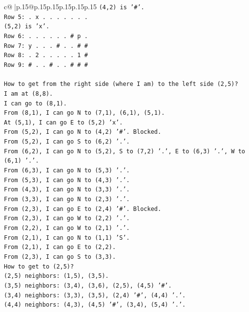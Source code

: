 \documentclass{article}
\begin{document}
{\begin{supertabular}{c@{$\;$}|p{.15\linewidth}@{}p{.15\linewidth}p{.15\linewidth}p{.15\linewidth}p{.15\linewidth}p{.15\linewidth}}
{{{\texttt{(4,2) is '\#'.} \\
\texttt{Row 5: . x . . . . . . .} \\
\texttt{(5,2) is 'x'.} \\
\texttt{Row 6: . . . . . . \# p .} \\
\texttt{Row 7: y . . . \# . . \# \#} \\
\texttt{Row 8: . 2 . . . . . 1 \#} \\
\texttt{Row 9: \# . . \# . . \# \# \#} \\
\\ 
\texttt{How to get from the right side (where I am) to the left side (2,5)?} \\
\texttt{I am at (8,8).} \\
\texttt{I can go to (8,1).} \\
\texttt{From (8,1), I can go N to (7,1), (6,1), (5,1).} \\
\texttt{At (5,1), I can go E to (5,2) 'x'.} \\
\texttt{From (5,2), I can go N to (4,2) '\#'. Blocked.} \\
\texttt{From (5,2), I can go S to (6,2) '.'.} \\
\texttt{From (6,2), I can go N to (5,2), S to (7,2) '.', E to (6,3) '.', W to (6,1) '.'.} \\
\texttt{From (6,3), I can go N to (5,3) '.'.} \\
\texttt{From (5,3), I can go N to (4,3) '.'.} \\
\texttt{From (4,3), I can go N to (3,3) '.'.} \\
\texttt{From (3,3), I can go N to (2,3) '.'.} \\
\texttt{From (2,3), I can go E to (2,4) '\#'. Blocked.} \\
\texttt{From (2,3), I can go W to (2,2) '.'.} \\
\texttt{From (2,2), I can go W to (2,1) '.'.} \\
\texttt{From (2,1), I can go N to (1,1) 'S'.} \\
\texttt{From (2,1), I can go E to (2,2).} \\
\texttt{From (2,3), I can go S to (3,3).} \\
\texttt{How to get to (2,5)?} \\
\texttt{(2,5) neighbors: (1,5), (3,5).} \\
\texttt{(3,5) neighbors: (3,4), (3,6), (2,5), (4,5) '\#'.} \\
\texttt{(3,4) neighbors: (3,3), (3,5), (2,4) '\#', (4,4) '.'.} \\
\texttt{(4,4) neighbors: (4,3), (4,5) '\#', (3,4), (5,4) '.'.} \\
}}}
\end{supertabular}}
\end{document}

